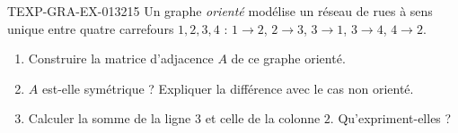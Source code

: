 \begin{exercice}{TEXP-GRA-EX-013}{2}{15}
Un graphe \emph{orienté} modélise un réseau de rues à sens unique entre quatre
carrefours $1,2,3,4$ : $1\to2$, $2\to3$, $3\to1$, $3\to4$, $4\to2$.
\begin{enumerate}
  \item Construire la matrice d'adjacence $A$ de ce graphe orienté.
  \item $A$ est-elle symétrique ? Expliquer la différence avec le cas non
        orienté.
  \item Calculer la somme de la ligne $3$ et celle de la colonne $2$.
        Qu'expriment-elles ?
\end{enumerate}
\end{exercice}
